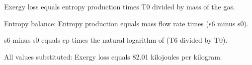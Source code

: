 Exergy loss equals entropy production times T0 divided by mass of the gas.  

Entropy balance:  
Entropy production equals mass flow rate times (s6 minus s0).  

s6 minus s0 equals cp times the natural logarithm of (T6 divided by T0).  

All values substituted:  
Exergy loss equals 82.01 kilojoules per kilogram.